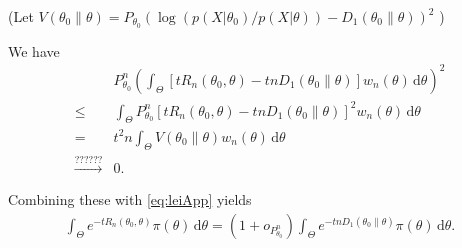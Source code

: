 \documentclass[11pt]{article}
\theoremstyle{plain}
\theoremstyle{definition}
\theoremstyle{remark}
\begin{document}
\begin{appendices}
(Let $V(\theta_0 \| \theta) = P_{\theta_0} \left( \log \left( p(X|\theta_0) / p(X | \theta) \right) - D_1 (\theta_0 \| \theta) \right)^2$ )

We have
\begin{align*}
    &
    P_{\theta_0}^n
    \left( 
    \int_{\Theta}
    \left[   t R_n(\theta_0, \theta) - tn D_1 (\theta_0 \| \theta )  \right]
    w_n (\theta) \, \mathrm d \theta
    \right)^2
    \\
    \leq&
    \int_{\Theta}
    P_{\theta_0}^n
    \left[   t R_n(\theta_0, \theta) - tn D_1 (\theta_0 \| \theta )  \right]^2
    w_n (\theta) \, \mathrm d \theta
    \\
    =&
        t^2 n
    \int_{\Theta}
     V(\theta_0 \| \theta)
    w_n (\theta) \, \mathrm d \theta
    \\
    \xrightarrow{??????} & 0.
\end{align*}

Combining these with \eqref{eq:leiApp} yields
\begin{align*}
     \int_{\Theta} e^{-t R_n (\theta_0, \theta)} \pi (\theta) \, \mathrm d \theta  
    =
    (1+o_{P_{\theta_0}^n})
    \int_\Theta e^{-tn D_1 \left( \theta_0 \| \theta \right)} \pi(\theta) \, \mathrm d \theta.
\end{align*}




\end{appendices}
\end{document}
